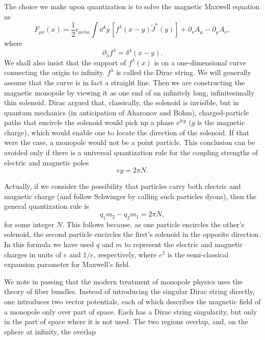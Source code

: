 The choice we make upon quantization is to solve the magnetic Maxwell equation
as
\begin{equation*}
  F_{\mu\nu}(x)=\frac12\epsilon_{\mu\nu\lambda\kappa}
  \int\dd^4y\,[f^\lambda(x-y)\widetilde J^\kappa(y)]
  +\partial_\nu A_\mu-\partial_\mu A_\nu,
\end{equation*}
where
\begin{equation*}
  \partial_\lambda f^\lambda=\delta^4(x-y).
\end{equation*}
We shall also insist that the support of $f^\lambda(x)$ is on a one-dimensional
curve connecting the origin to infinity. $f^\lambda$ is called the Dirac
string. We will generally assume that the curve is in fact a straight line.
Then we are constructing the magnetic monopole by viewing it as one end of an
infinitely long, infinitesimally thin solenoid. Dirac argued that, classically,
the solenoid is invisible, but in quantum mechanics (in anticipation of
Aharonov and Bohm), charged-particle paths that encircle the solenoid would
pick up a phase $e^{\ii e g}$ ($g$ is the magnetic charge), which would enable
one to locate the direction of the solenoid. If that were the case, a monopole
would not be a point particle. This conclusion can be avoided only if there is a
universal quantization rule for the coupling strengths of electric and magnetic
poles
\begin{equation*}
  eg=2\pi N.
\end{equation*}

Actually, if we consider the possibility that particles carry both electric and
magnetic charge (and follow Schwinger by calling such particles dyons), then the
general quantization rule is
\begin{equation*}
  q_1m_2-q_2m_1=2\pi N,
\end{equation*}
for some integer $N$. This follows because, as one particle encircles the
other's solenoid, the second particle encircles the first's solenoid in the
opposite direction. In this formula we have used $q$ and $m$ to represent the
electric and magnetic charges in units of $e$ and $1/e$, respectively, where
$e^2$ is the semi-classical expansion parameter for Maxwell's field.

We note in passing that the modern treatment of monopole physics uses the
theory of fiber bundles. Instead of introducing the singular Dirac string
directly, one introduces two vector potentials, each of which describes the
magnetic field of a monopole only over part of space. Each has a Dirac string
singularity, but only in the part of space where it is not used. The two regions
overlap, and, on the sphere at infinity, the overlap

